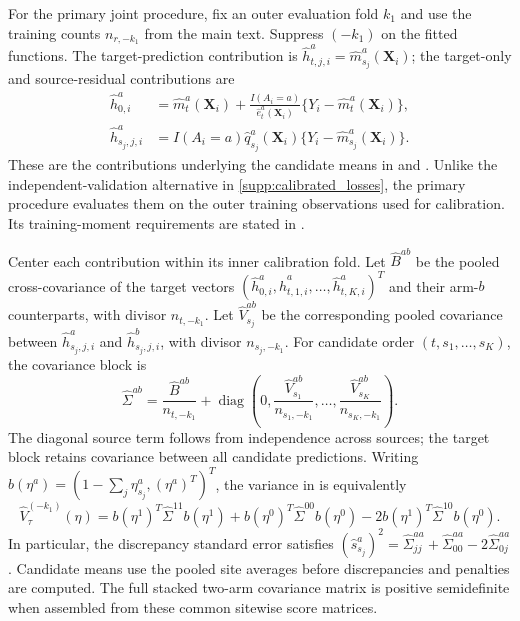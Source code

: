 \documentclass[12pt]{article}
\begin{document}
For the primary joint procedure, fix an outer evaluation fold $k_1$ and use the training counts $n_{r,-k_1}$ from the main text. Suppress $(-k_1)$ on the fitted functions. The target-prediction contribution is $\widehat h_{t,j,i}^a=\widehat m_{s_j}^a(\boldsymbol X_i)$; the target-only and source-residual contributions are
\begin{equation}\label{eq:joint_covariance_scores}
\begin{aligned}
\widehat h_{0,i}^a&=\widehat m_t^a(\boldsymbol X_i)
+\frac{I(A_i=a)}{\widehat e_t^a(\boldsymbol X_i)}
\{Y_i-\widehat m_t^a(\boldsymbol X_i)\},\\
\widehat h_{s_j,j,i}^a&=I(A_i=a)\widehat q_{s_j}^a(\boldsymbol X_i)
\{Y_i-\widehat m_{s_j}^a(\boldsymbol X_i)\}.
\end{aligned}
\end{equation}
These are the contributions underlying the candidate means in  and . Unlike the independent-validation alternative in \cref{supp:calibrated_losses}, the primary procedure evaluates them on the outer training observations used for calibration. Its training-moment requirements are stated in .

Center each contribution within its inner calibration fold. Let $\widehat B^{ab}$ be the pooled cross-covariance of the target vectors $(\widehat h_{0,i}^a,\widehat h_{t,1,i}^a,\ldots,\widehat h_{t,K,i}^a)^T$ and their arm-$b$ counterparts, with divisor $n_{t,-k_1}$. Let $\widehat V_{s_j}^{ab}$ be the corresponding pooled covariance between $\widehat h_{s_j,j,i}^a$ and $\widehat h_{s_j,j,i}^b$, with divisor $n_{s_j,-k_1}$. For candidate order $(t,s_1,\ldots,s_K)$, the covariance block is
\[
\widehat\Sigma^{ab}=\frac{\widehat B^{ab}}{n_{t,-k_1}}
+\operatorname{diag}\left(0,\frac{\widehat V_{s_1}^{ab}}{n_{s_1,-k_1}},\ldots,
\frac{\widehat V_{s_K}^{ab}}{n_{s_K,-k_1}}\right).
\]
The diagonal source term follows from independence across sources; the target block retains covariance between all candidate predictions. Writing $b(\eta^a)=(1-\sum_j\eta_{s_j}^a,(\eta^a)^T)^T$, the variance in  is equivalently
\[
\widehat V_\tau^{(-k_1)}(\eta)
=b(\eta^1)^T\widehat\Sigma^{11}b(\eta^1)
+b(\eta^0)^T\widehat\Sigma^{00}b(\eta^0)
-2b(\eta^1)^T\widehat\Sigma^{10}b(\eta^0).
\]
In particular, the discrepancy standard error satisfies $(\widehat s_{s_j}^a)^2=\widehat\Sigma^{aa}_{jj}+\widehat\Sigma^{aa}_{00}-2\widehat\Sigma^{aa}_{0j}$. Candidate means use the pooled site averages before discrepancies and penalties are computed. The full stacked two-arm covariance matrix is positive semidefinite when assembled from these common sitewise score matrices.
\end{document}
